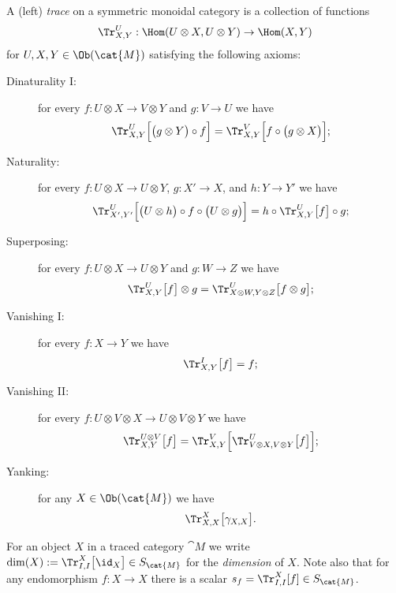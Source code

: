 A (left) \emph{trace} on a symmetric monoidal category is a collection of functions 
\[\Tr^U_{X,Y}:\Hom(U\otimes X,U\otimes Y)\to\Hom(X,Y)\]
for $U,X,Y\in\Ob(\cat{M})$ satisfying the following axioms:
\begin{description}
 \item [Dinaturality I:] for every $f:U\otimes X\to V\otimes Y$ and $g:V\to U$ we have
 \[\Tr^U_{X,Y}\Big[\big(g\otimes Y\big)\circ f\Big]=\Tr^V_{X,Y}\Big[f\circ\big(g\otimes X\big)\Big];\] 
 \item [Naturality:] for every $f:U\otimes X\to U\otimes Y$, $g:X'\to X$, and $h:Y\to Y'$ we have
 \[\Tr^U_{X',Y'}\Big[\big(U\otimes h\big)\circ f\circ\big(U\otimes g\big)\Big]=h\circ\Tr^U_{X,Y}\big[f\big]\circ g;\]
 \item [Superposing:] for every $f:U\otimes X\to U\otimes Y$ and $g:W\to Z$ we have
 \[\Tr^U_{X,Y}\big[f\big]\otimes g=\Tr^U_{X\otimes W,Y\otimes Z}\big[f\otimes g\big];\]
 \item [Vanishing I:] for every $f:X\to Y$ we have
 \[\Tr^{I}_{X,Y}\big[f\big]=f;\]
 \item [Vanishing II:] for every $f:U\otimes V\otimes X\to U\otimes V\otimes Y$ we have
 \[\Tr^{U\otimes V}_{X,Y}\big[f\big]=\Tr^V_{X,Y}\Big[\Tr^U_{V\otimes X,V\otimes Y}\big[f\big]\Big];\]
 \item [Yanking:] for any $X\in\Ob(\cat{M})$ we have
 \[\Tr^X_{X,X}\big[\gamma_{X,X}\big].\]
\end{description}

For an object $X$ in a traced category $\cat{M}$ we write $\dim(X):=\Tr^X_{I,I}\big[\id_X\big]\in S_{\cat{M}}$ for the {\em dimension} of $X$.  Note also that for any endomorphism $f:X\to X$ there is a scalar $s_f=\Tr^X_{I,I}[f]\in S_{\cat{M}}$.

